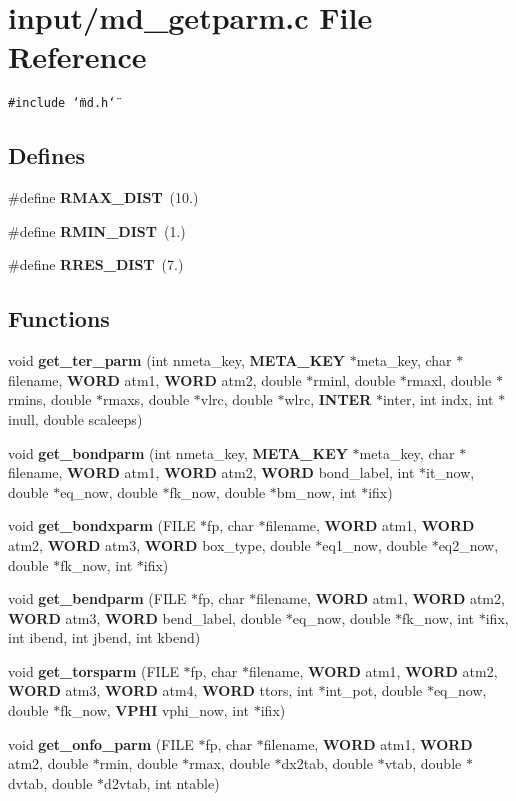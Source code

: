 \section{input/md\_\-getparm.c File Reference}
\label{input_2md__getparm_8c}
{\tt \#include \char`\"{}md.h\char`\"{}}\par
\subsection*{Defines}
\begin{CompactItemize}
\item 
\#define {\bf RMAX\_\-DIST}~(10.)
\item 
\#define {\bf RMIN\_\-DIST}~(1.)
\item 
\#define {\bf RRES\_\-DIST}~(7.)
\end{CompactItemize}
\subsection*{Functions}
\begin{CompactItemize}
\item 
void {\bf get\_\-ter\_\-parm} (int nmeta\_\-key, {\bf META\_\-KEY} $\ast$meta\_\-key, char $\ast$filename, {\bf WORD} atm1, {\bf WORD} atm2, double $\ast$rminl, double $\ast$rmaxl, double $\ast$rmins, double $\ast$rmaxs, double $\ast$vlrc, double $\ast$wlrc, {\bf INTER} $\ast$inter, int indx, int $\ast$inull, double scaleeps)
\item 
void {\bf get\_\-bondparm} (int nmeta\_\-key, {\bf META\_\-KEY} $\ast$meta\_\-key, char $\ast$filename, {\bf WORD} atm1, {\bf WORD} atm2, {\bf WORD} bond\_\-label, int $\ast$it\_\-now, double $\ast$eq\_\-now, double $\ast$fk\_\-now, double $\ast$bm\_\-now, int $\ast$ifix)
\item 
void {\bf get\_\-bondxparm} (FILE $\ast$fp, char $\ast$filename, {\bf WORD} atm1, {\bf WORD} atm2, {\bf WORD} atm3, {\bf WORD} box\_\-type, double $\ast$eq1\_\-now, double $\ast$eq2\_\-now, double $\ast$fk\_\-now, int $\ast$ifix)
\item 
void {\bf get\_\-bendparm} (FILE $\ast$fp, char $\ast$filename, {\bf WORD} atm1, {\bf WORD} atm2, {\bf WORD} atm3, {\bf WORD} bend\_\-label, double $\ast$eq\_\-now, double $\ast$fk\_\-now, int $\ast$ifix, int ibend, int jbend, int kbend)
\item 
void {\bf get\_\-torsparm} (FILE $\ast$fp, char $\ast$filename, {\bf WORD} atm1, {\bf WORD} atm2, {\bf WORD} atm3, {\bf WORD} atm4, {\bf WORD} ttors, int $\ast$int\_\-pot, double $\ast$eq\_\-now, double $\ast$fk\_\-now, {\bf VPHI} vphi\_\-now, int $\ast$ifix)
\item 
void {\bf get\_\-onfo\_\-parm} (FILE $\ast$fp, char $\ast$filename, {\bf WORD} atm1, {\bf WORD} atm2, double $\ast$rmin, double $\ast$rmax, double $\ast$dx2tab, double $\ast$vtab, double $\ast$dvtab, double $\ast$d2vtab, int ntable)
\end{CompactItemize}



